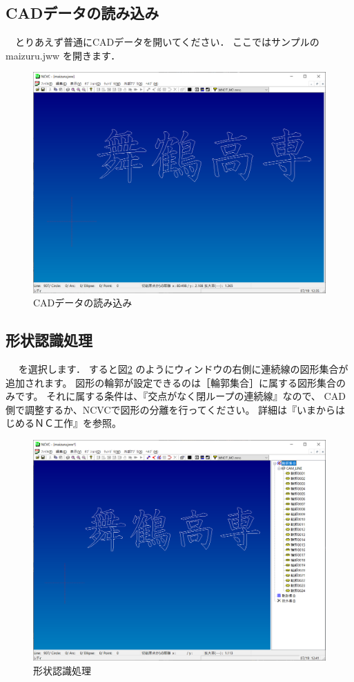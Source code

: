 

\subsection{CADデータの読み込み}
　とりあえず普通にCADデータを開いてください．
ここではサンプルの maizuru.jww を開きます．

\begin{figure}[H]
\centering
\includegraphics[scale=0.55]{No1/fig/maizuru1.png}
\caption{CADデータの読み込み}
\label{fig:maizuru1.png}
\end{figure}

\subsection{形状認識処理}
　 を選択します．
すると図\ref{fig:maizuru2.png} のようにウィンドウの右側に連続線の図形集合が追加されます。
図形の輪郭が設定できるのは［輪郭集合］に属する図形集合のみです。
それに属する条件は、『交点がなく閉ループの連続線』なので、
CAD側で調整するか、NCVCで図形の分離を行ってください。
詳細は『いまからはじめるＮＣ工作』を参照。

\begin{figure}[H]
\centering
\includegraphics[scale=0.55]{No1/fig/maizuru2.png}
\caption{形状認識処理}
\label{fig:maizuru2.png}
\end{figure}
